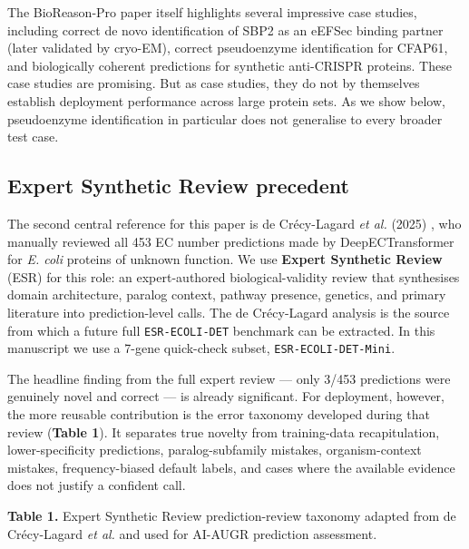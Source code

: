 \documentclass[
  11pt,
]{article}
\begin{document}
The BioReason-Pro paper itself highlights several impressive case
studies, including correct de novo identification of SBP2 as an eEFSec
binding partner (later validated by cryo-EM), correct pseudoenzyme
identification for CFAP61, and biologically coherent predictions for
synthetic anti-CRISPR proteins. These case studies are promising. But
as case studies, they do not by themselves establish deployment
performance across large protein sets. As we show below, pseudoenzyme
identification in particular does not generalise to every broader test
case.

\hypertarget{expert-synthetic-review-precedent}{%
\subsection{Expert Synthetic Review
precedent}\label{expert-synthetic-review-precedent}}

The second central reference for this paper is de Crécy-Lagard \emph{et
al.} (2025) \cite{decrecylagard2025}, who manually reviewed all 453 EC number
predictions made by DeepECTransformer for \emph{E. coli} proteins of
unknown function. We use \textbf{Expert Synthetic Review} (ESR) for this
role: an expert-authored biological-validity review that synthesises
domain architecture, paralog context, pathway presence, genetics, and
primary literature into prediction-level calls. The de Crécy-Lagard
analysis is the source from which a future full \texttt{ESR-ECOLI-DET}
benchmark can be extracted. In this manuscript we use a 7-gene
quick-check subset, \texttt{ESR-ECOLI-DET-Mini}.

The headline finding from the full expert review --- only 3/453
predictions were genuinely novel and correct --- is already significant.
For deployment, however, the more reusable contribution is the error
taxonomy developed during that review (\textbf{Table 1}). It separates
true novelty from training-data recapitulation, lower-specificity
predictions, paralog-subfamily mistakes, organism-context mistakes,
frequency-biased default labels, and cases where the available evidence
does not justify a confident call.

\textbf{Table 1.} Expert Synthetic Review prediction-review taxonomy
adapted from de Crécy-Lagard \emph{et al.} \cite{decrecylagard2025} and used for AI-AUGR
prediction assessment.
\end{document}
